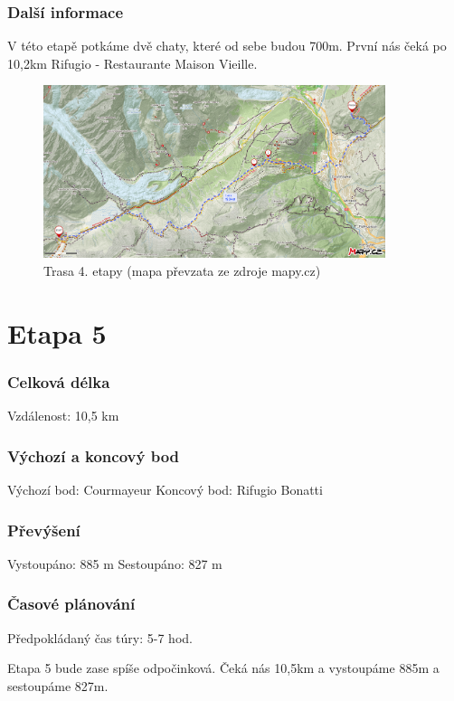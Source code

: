 \subsubsection*{Další informace}
V této etapě potkáme dvě chaty, které od sebe budou 700\:m. První nás čeká po 10,2\:km Rifugio - Restaurante Maison Vieille.
\begin{figure}[!hbt]
    \centering
    \includegraphics[width=10.0cm]{Figures/day_4.png}
    \caption[Trasa: den čtvrtý]{Trasa 4. etapy (mapa převzata ze zdroje mapy.cz)}
    \label{Obr:day_4}
\end{figure} 
\section{Etapa 5}
\subsubsection*{Celková délka}
\noindent Vzdálenost: 10,5 km
\subsubsection*{Výchozí a koncový bod}
\noindent Výchozí bod: Courmayeur
\noindent Koncový bod: Rifugio Bonatti
\subsubsection*{Převýšení}
\noindent Vystoupáno: 885 m
\noindent Sestoupáno: 827 m
\subsubsection*{Časové plánování}
\noindent Předpokládaný čas túry: 5-7 hod.

Etapa 5 bude zase spíše odpočinková. Čeká nás 10,5\:km a vystoupáme 885\:m a sestoupáme 827\:m.

